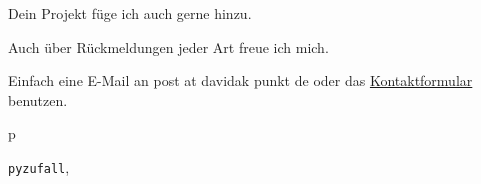 \documentclass[a4paper,12pt,oneside]{sphinxmanual}
\begin{document}
Dein Projekt füge ich auch gerne hinzu.

Auch über Rückmeldungen jeder Art freue ich mich.

Einfach eine E-Mail an post at davidak punkt de oder das \href{http://davidak.de/kontakt}{Kontaktformular} benutzen.


\renewcommand{\indexname}{Python-Modulindex}
\begin{theindex}
\def\bigletter#1{{\Large\sffamily#1}\nopagebreak\vspace{1mm}}
\bigletter{p}
\item {\texttt{pyzufall}}, \pageref{funktionen:module-pyzufall}
\end{theindex}

\renewcommand{\indexname}{Stichwortverzeichnis}
\printindex
\end{document}
